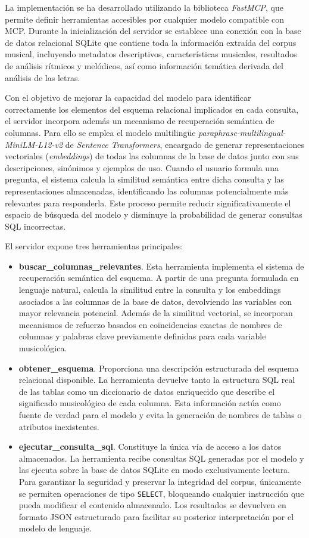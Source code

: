 La implementación se ha desarrollado utilizando la biblioteca \textit{FastMCP}, que permite definir herramientas accesibles por cualquier modelo compatible con MCP. Durante la inicialización del servidor se establece una conexión con la base de datos relacional SQLite que contiene toda la información extraída del corpus musical, incluyendo metadatos descriptivos, características musicales, resultados de análisis rítmicos y melódicos, así como información temática derivada del análisis de las letras.

Con el objetivo de mejorar la capacidad del modelo para identificar correctamente los elementos del esquema relacional implicados en cada consulta, el servidor incorpora además un mecanismo de recuperación semántica de columnas. Para ello se emplea el modelo multilingüe \textit{paraphrase-multilingual-MiniLM-L12-v2} de \textit{Sentence Transformers}, encargado de generar representaciones vectoriales (\textit{embeddings}) de todas las columnas de la base de datos junto con sus descripciones, sinónimos y ejemplos de uso. Cuando el usuario formula una pregunta, el sistema calcula la similitud semántica entre dicha consulta y las representaciones almacenadas, identificando las columnas potencialmente más relevantes para responderla. Este proceso permite reducir significativamente el espacio de búsqueda del modelo y disminuye la probabilidad de generar consultas SQL incorrectas.

El servidor expone tres herramientas principales:

\begin{itemize}
\item \textbf{buscar\_columnas\_relevantes}. Esta herramienta implementa el sistema de recuperación semántica del esquema. A partir de una pregunta formulada en lenguaje natural, calcula la similitud entre la consulta y los embeddings asociados a las columnas de la base de datos, devolviendo las variables con mayor relevancia potencial. Además de la similitud vectorial, se incorporan mecanismos de refuerzo basados en coincidencias exactas de nombres de columnas y palabras clave previamente definidas para cada variable musicológica.
\item \textbf{obtener\_esquema}. Proporciona una descripción estructurada del esquema relacional disponible. La herramienta devuelve tanto la estructura SQL real de las tablas como un diccionario de datos enriquecido que describe el significado musicológico de cada columna. Esta información actúa como fuente de verdad para el modelo y evita la generación de nombres de tablas o atributos inexistentes.
\item \textbf{ejecutar\_consulta\_sql}. Constituye la única vía de acceso a los datos almacenados. La herramienta recibe consultas SQL generadas por el modelo y las ejecuta sobre la base de datos SQLite en modo exclusivamente lectura. Para garantizar la seguridad y preservar la integridad del corpus, únicamente se permiten operaciones de tipo \texttt{SELECT}, bloqueando cualquier instrucción que pueda modificar el contenido almacenado. Los resultados se devuelven en formato JSON estructurado para facilitar su posterior interpretación por el modelo de lenguaje.
\end{itemize}

